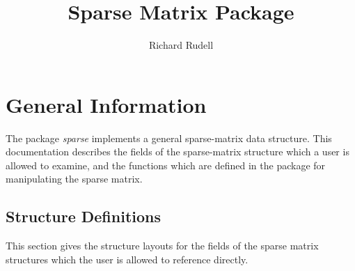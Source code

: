 \setlength{\textwidth}{6.5in}
\setlength{\textheight}{9in}
\addtolength{\topmargin}{-0.875in}
\addtolength{\oddsidemargin}{-0.875in}



\title {Sparse Matrix Package}
\author {Richard Rudell}
\maketitle

\section{General Information}
The package {\em sparse} implements a general sparse-matrix data structure.
This documentation describes the fields of the sparse-matrix structure which
a user is allowed to examine, and the functions which are defined in the
package for manipulating the sparse matrix.


\subsection{Structure Definitions}
This section gives the structure layouts for the fields of the sparse
matrix structures which the user is allowed to reference directly.

